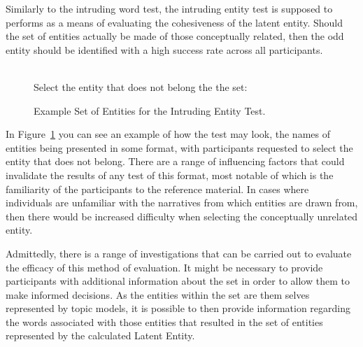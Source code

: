 \documentclass[10pt]{report}
\begin{document}
Similarly to the intruding word test, the intruding entity test is supposed to performs as a means of evaluating the cohesiveness of the latent entity. Should the set of entities actually be made of those conceptually related, then the odd entity should be identified with a high success rate across all participants.

\begin{figure}[h!]
  \centering
  \\
Select the entity that does not belong the the set: \underline{\quad \quad \quad \quad \quad \quad}
  \caption{Example Set of Entities for the Intruding Entity Test.\label{fig:intruding_entity}}
\end{figure}

In Figure~\ref{fig:intruding_entity} you can see an example of how the test may look, the names of entities being presented in some format, with participants requested to select the entity that does not belong. There are a range of influencing factors that could invalidate the results of any test of this format, most notable of which is the familiarity of the participants to the reference material. In cases where individuals are unfamiliar with the narratives from which entities are drawn from, then there would be increased difficulty when selecting the conceptually unrelated entity.

Admittedly, there is a range of investigations that can be carried out to evaluate the efficacy of this method of evaluation. It might be necessary to provide participants with additional information about the set in order to allow them to make informed decisions. As the entities within the set are them selves represented by topic models, it is possible to then provide information regarding the words associated with those entities that resulted in the set of entities represented by the calculated Latent Entity.
\end{document}
